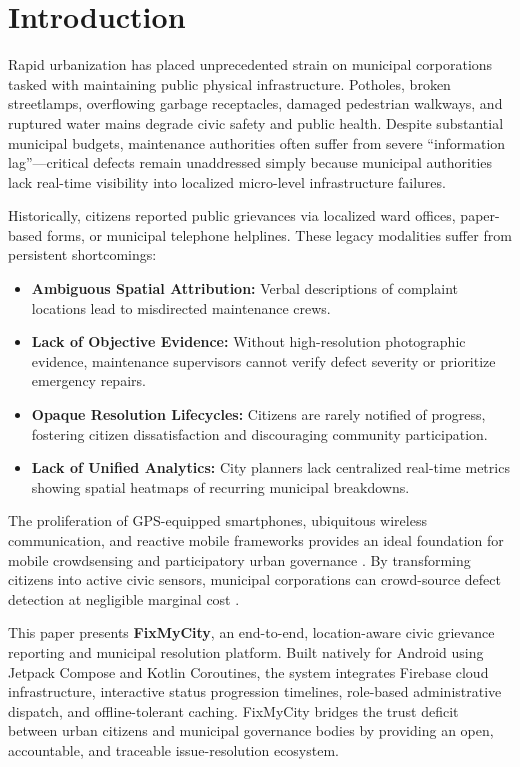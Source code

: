 \documentclass[conference]{IEEEtran}
\begin{document}
\section{Introduction}

Rapid urbanization has placed unprecedented strain on municipal corporations tasked with maintaining public physical infrastructure. Potholes, broken streetlamps, overflowing garbage receptacles, damaged pedestrian walkways, and ruptured water mains degrade civic safety and public health. Despite substantial municipal budgets, maintenance authorities often suffer from severe ``information lag''---critical defects remain unaddressed simply because municipal authorities lack real-time visibility into localized micro-level infrastructure failures.

Historically, citizens reported public grievances via localized ward offices, paper-based forms, or municipal telephone helplines. These legacy modalities suffer from persistent shortcomings:
\begin{itemize}
    \item \textbf{Ambiguous Spatial Attribution:} Verbal descriptions of complaint locations lead to misdirected maintenance crews.
    \item \textbf{Lack of Objective Evidence:} Without high-resolution photographic evidence, maintenance supervisors cannot verify defect severity or prioritize emergency repairs.
    \item \textbf{Opaque Resolution Lifecycles:} Citizens are rarely notified of progress, fostering citizen dissatisfaction and discouraging community participation.
    \item \textbf{Lack of Unified Analytics:} City planners lack centralized real-time metrics showing spatial heatmaps of recurring municipal breakdowns.
\end{itemize}

The proliferation of GPS-equipped smartphones, ubiquitous wireless communication, and reactive mobile frameworks provides an ideal foundation for mobile crowdsensing and participatory urban governance \cite{ref3, ref4, ref8}. By transforming citizens into active civic sensors, municipal corporations can crowd-source defect detection at negligible marginal cost \cite{ref6, ref10}.

This paper presents \textbf{FixMyCity}, an end-to-end, location-aware civic grievance reporting and municipal resolution platform. Built natively for Android using Jetpack Compose and Kotlin Coroutines, the system integrates Firebase cloud infrastructure, interactive status progression timelines, role-based administrative dispatch, and offline-tolerant caching. FixMyCity bridges the trust deficit between urban citizens and municipal governance bodies by providing an open, accountable, and traceable issue-resolution ecosystem.
\end{document}

